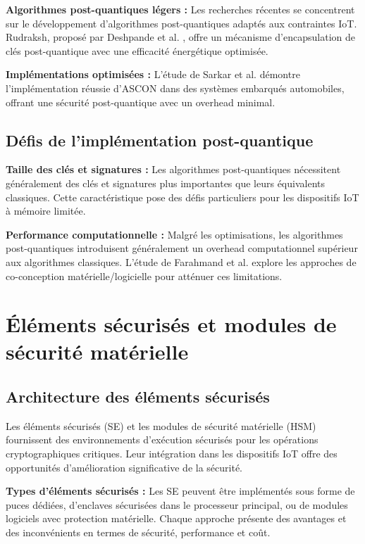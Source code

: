 \textbf{Algorithmes post-quantiques légers :} Les recherches récentes se concentrent sur le développement d'algorithmes post-quantiques adaptés aux contraintes IoT. Rudraksh, proposé par Deshpande et al. \cite{Deshpande2024Rudraksh}, offre un mécanisme d'encapsulation de clés post-quantique avec une efficacité énergétique optimisée.

\textbf{Implémentations optimisées :} L'étude de Sarkar et al. \cite{Sarkar2024AsconAutomotive} démontre l'implémentation réussie d'ASCON dans des systèmes embarqués automobiles, offrant une sécurité post-quantique avec un overhead minimal.

\subsection{Défis de l'implémentation post-quantique}

\textbf{Taille des clés et signatures :} Les algorithmes post-quantiques nécessitent généralement des clés et signatures plus importantes que leurs équivalents classiques. Cette caractéristique pose des défis particuliers pour les dispositifs IoT à mémoire limitée.

\textbf{Performance computationnelle :} Malgré les optimisations, les algorithmes post-quantiques introduisent généralement un overhead computationnel supérieur aux algorithmes classiques. L'étude de Farahmand et al. \cite{Farahmand2024HardwareSoftware} explore les approches de co-conception matérielle/logicielle pour atténuer ces limitations.

\section{Éléments sécurisés et modules de sécurité matérielle}

\subsection{Architecture des éléments sécurisés}

Les éléments sécurisés (\ac{SE}) et les modules de sécurité matérielle (\ac{HSM}) fournissent des environnements d'exécution sécurisés pour les opérations cryptographiques critiques. Leur intégration dans les dispositifs IoT offre des opportunités d'amélioration significative de la sécurité.

\textbf{Types d'éléments sécurisés :} Les SE peuvent être implémentés sous forme de puces dédiées, d'enclaves sécurisées dans le processeur principal, ou de modules logiciels avec protection matérielle. Chaque approche présente des avantages et des inconvénients en termes de sécurité, performance et coût.

